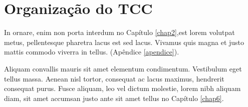 \section{Organização do TCC}

In ornare, enim non porta interdum no Capítulo \ref{chap2},est lorem volutpat metus, pellentesque pharetra lacus est sed lacus. Vivamus quis magna et justo mattis commodo viverra in tellus. (Apêndice \ref{apendice}).

Aliquam convallis mauris sit amet elementum condimentum. Vestibulum eget tellus massa. Aenean nisl tortor, consequat ac lacus maximus, hendrerit consequat purus. Fusce aliquam, leo vel dictum molestie, lorem nibh aliquam diam, sit amet accumsan justo ante sit amet tellus no Capítulo \ref{chap6}.